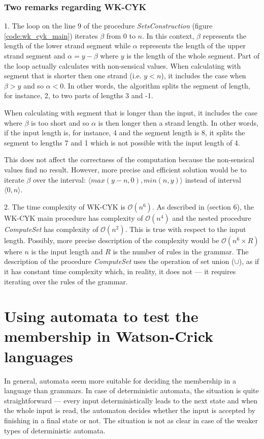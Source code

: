\subsubsection{Two remarks regarding WK-CYK}
1. The loop on the line 9 of the procedure \textit{SetsConstruction} (figure \ref{code:wk_cyk_main}) iterates $\beta$ from 0 to $n$. In this context, $\beta$ represents the length of the lower strand segment while $\alpha$ represents the length of the upper strand segment and $\alpha = y - \beta$ where $y$ is the length of the whole segment. Part of the loop actually calculates with non-sensical values. When calculating with segment that is shorter then one strand (i.e. $y < n$), it includes the case when $\beta > y$ and so $\alpha < 0$. In other words, the algorithm splits the segment of length, for instance, 2, to two parts of lengths 3 and -1.

When calculating with segment that is longer than the input, it includes the case where $\beta$ is too short and so $\alpha$ is then longer then a strand length. In other words, if the input length is, for instance, 4 and the segment length is 8, it splits the segment to lengths 7 and 1 which is not possible with the input length of 4.

This does not affect the correctness of the computation because the non-sensical values find no result. However, more precise and efficient solution would be to iterate $\beta$ over the interval: $\langle max(y-n, 0), min(n, y)\rangle$ instead of interval $\langle 0, n\rangle$.

\medskip

2. The time complexity of WK-CYK is $\mathcal{O}(n^6)$. As described in \cite{WK_CYK} (section 6), the WK-CYK main procedure has complexity of $\mathcal{O}(n^4)$ and the nested procedure \textit{ComputeSet} has complexity of $\mathcal{O}(n^2)$. This is true with respect to the input length. Possibly, more precise description of the complexity would be $\mathcal{O}(n^6 \times R)$ where $n$ is the input length and $R$ is the number of rules in the grammar. The description of the procedure \textit{ComputeSet} uses the operation of set union ($\cup$), as if it has constant time complexity which, in reality, it does not --- it requires iterating over the rules of the grammar.

\section{Using automata to test the membership in Watson-Crick languages}
In general, automata seem more suitable for deciding the membership in a language than grammars. In case of deterministic automata, the situation is quite straightforward --- every input deterministically leads to the next state and when the whole input is read, the automaton decides whether the input is accepted by finishing in a final state or not. The situation is not as clear in case of the weaker types of deterministic automata.


